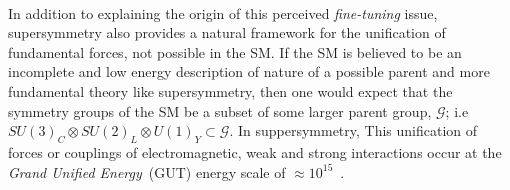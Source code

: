 \paragraph*{}
In addition to explaining the origin of this perceived \textit{fine-tuning} issue, supersymmetry also provides a natural framework for the unification of fundamental forces, not possible in the SM.
If the SM is believed to be an incomplete and low energy description of nature of a possible parent and more fundamental theory like supersymmetry, then one would expect that the symmetry groups of the SM be a subset of some larger parent group, $\mathcal{G}$; i.e $\displaystyle{SU(3)_{C} \otimes SU(2)_{L} \otimes U(1)_{Y} \subset \mathcal{G}}$.
In suppersymmetry, This unification of forces or couplings of electromagnetic, weak and strong interactions occur at the \textit{Grand Unified Energy}~(GUT) energy scale of $\approx 10^{15}$~\GeV \cite{SM}.


